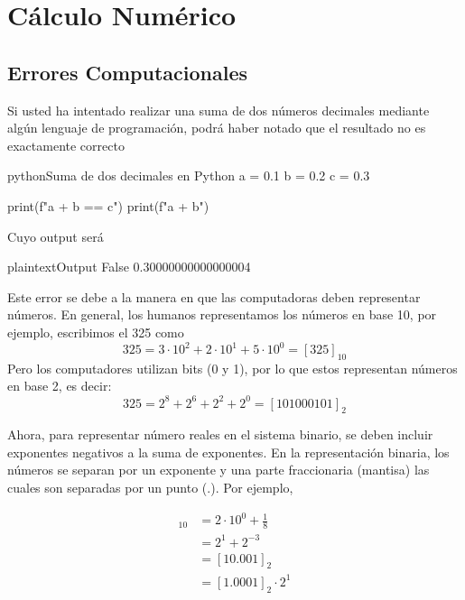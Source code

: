 \section{Cálculo Numérico}

\subsection{Errores Computacionales}

Si usted ha intentado realizar una suma de dos números decimales mediante algún lenguaje de programación, podrá haber notado que el resultado no es exactamente correcto
\begin{sourcecode}{python}{Suma de dos decimales en Python}
  a = 0.1
  b = 0.2
  c = 0.3

  print(f"{a + b == c}")
  print(f"{a + b}")
\end{sourcecode}
Cuyo output será

\begin{sourcecode}{plaintext}{Output}
  False
  0.30000000000000004
\end{sourcecode}

Este error se debe a la manera en que las computadoras deben representar números. En general, los humanos representamos los números en base 10, por ejemplo, escribimos el 325 como
\begin{equation*}
  325 = 3\cdot 10^{2} + 2\cdot 10^{1} + 5\cdot 10^{0} = [325]_{10}
\end{equation*}
Pero los computadores utilizan bits (0 y 1), por lo que estos representan números en base 2, es decir:
\begin{equation*}
  325 = 2^{8} + 2^{6} + 2^{2} + 2^{0} = [101000101]_{2}
\end{equation*}

Ahora, para representar número reales en el sistema binario, se deben incluir exponentes negativos a la suma de exponentes. En la representación binaria, los números se separan por un exponente y una parte fraccionaria (mantisa) las cuales son separadas por un punto ($.$). Por ejemplo,

\begin{align*}
  [2.145]_{10} &= 2\cdot 10^{0} + \frac{1}{8} \\
               &= 2^{1} + 2^{-3} \\
               &= [10.001]_{2} \\
               &= [1.0001]_{2} \cdot 2^{1}
\end{align*}

